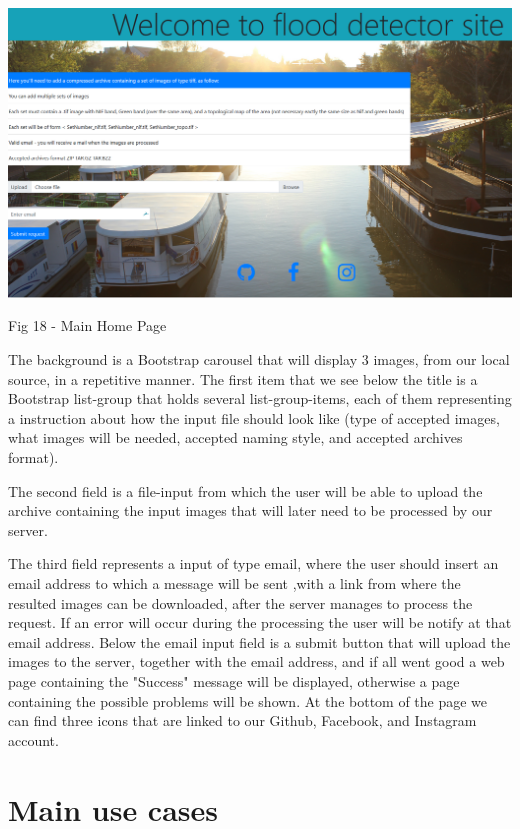 \documentclass[12pt, a4paper]{report}
\begin{document}
\bigskip
\includegraphics[scale=0.4, center]{gui_homepage.png}
\begin{center}
Fig 18 - Main Home Page 
\end{center}
\par 

The background is a Bootstrap carousel that will display 3 images, from our local source, in a repetitive manner. The first item that we see below the title is a Bootstrap list-group that holds several list-group-items, each of them representing a instruction about how the input file should look like (type of accepted images, what images will be needed, accepted naming style, and accepted archives format).
\par 

The second field is a file-input from which the user will be able to upload the archive containing the input images that will later need to be processed by our server.
\par 

The third field represents a input of type email, where the user should insert an email address to which a message will be sent ,with a link from where the resulted images can be downloaded, after the server manages to process the request. If an error will occur during the processing the user will be notify at that email address. Below the email input field is a submit button that will upload the images to the server, together with the email address, and if all went good a web page containing the "Success" message will be displayed, otherwise a page containing the possible problems will be shown. At the bottom of the page we can find three icons that are linked to our Github, Facebook, and Instagram account.



\section{Main use cases}
\end{document}
